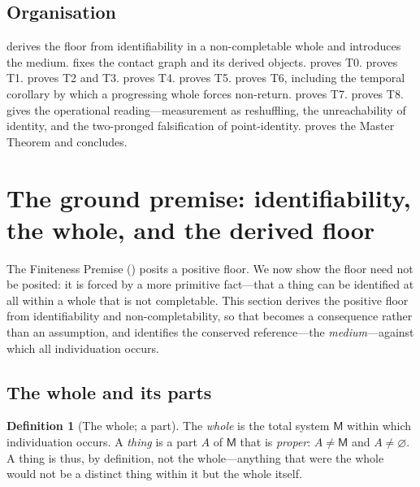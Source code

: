 \documentclass[11pt,a4paper]{article}
\theoremstyle{thmstyle}
\theoremstyle{definition}
\newtheorem{definition}[theorem]{Definition}
\theoremstyle{remark}
\newcommand{\med}{\mathsf{M}}             %
\begin{document}
\subsection{Organisation}

 derives the floor from identifiability in a non-completable
whole and introduces the medium.  fixes the contact graph and
its derived objects.  proves T0.  proves T1.
 proves T2 and T3.  proves T4.
 proves T5.  proves T6, including the temporal
corollary by which a progressing whole forces non-return. 
proves T7.  proves T8.  gives the
operational reading---measurement as reshuffling, the unreachability of identity,
and the two-pronged falsification of point-identity.  proves the
Master Theorem and concludes.


\section{The ground premise: identifiability, the whole, and the derived floor}
\label{sec:ground}

The Finiteness Premise () posits a positive floor. We now show
the floor need not be posited: it is forced by a more primitive fact---that a
thing can be identified at all within a whole that is not completable. This
section derives the positive floor from identifiability and non-completability,
so that  becomes a consequence rather than an assumption, and
identifies the conserved reference---the \emph{medium}---against which all
individuation occurs.

\subsection{The whole and its parts}

\begin{definition}[The whole; a part]
\label{def:whole}
The \emph{whole} is the total system $\med$ within which individuation occurs.
A \emph{thing} is a part $A$ of $\med$ that is \emph{proper}: $A\neq\med$ and
$A\neq\varnothing$. A thing is thus, by definition, not the whole---anything that
were the whole would not be a distinct thing within it but the whole itself.
\end{definition}
\end{document}
